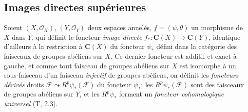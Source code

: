 \subsection{Images directes supérieures}
\label{subsection:0.12.2-fr}

\begin{env}[12.2.1]
\label{0.12.2.1-fr}
Soient $(X,\mathcal O_X)$, $(Y,\mathcal O_Y)$ deux espaces annelés,
$f=(\psi,\theta)$ un morphisme de $X$ dans $Y$, qui définit le foncteur
\emph{image directe}
$f_*:\boldsymbol{C}(X)\longrightarrow\boldsymbol{C}(Y)$,
identique d'ailleurs à la restriction à $\boldsymbol{C}(X)$ du foncteur $\psi_*$ défini
dans la catégorie des faisceaux de groupes abéliens sur $X$. Ce dernier
foncteur est additif et exact à gauche, et comme tout faisceau de groupes
abéliens sur $X$ est isomorphe à un sous-faisceau d'un faisceau \emph{injectif} de
groupes abéliens, on définit les \emph{foncteurs dérivés} droits
$\mathcal F\leadsto R^p\psi_*(\mathcal F)$ du foncteur $\psi_*$; les
$R^p\psi_*(\mathcal F)$ sont des faisceaux de groupes abéliens sur $Y$, et
les $R^p\psi_*$ forment un \emph{foncteur cohomologique universel} (T, 2.3).


\end{env}

